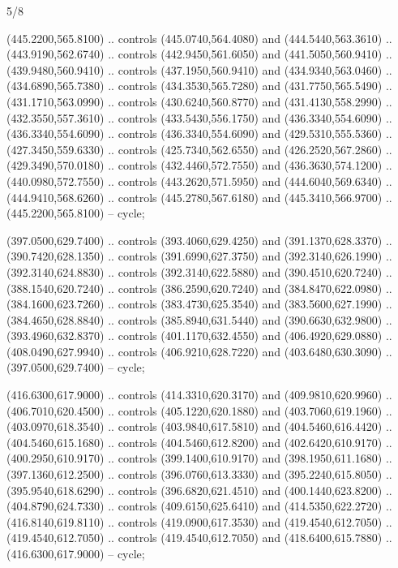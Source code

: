 \begin{flagdescription}{5/8}
\begin{scope}[shift={(m)}]
\begin{scope}[scale=\flagwidth/220,y=0.1mm, x=0.1mm, yscale=-1,shift={(-596,-360)}]
\begin{scope}[cm={{-1.0,0.0,0.0,1.0,(1193.9797,0.0)}}]
\begin{scope}[draw=black,line join=round,line cap=round,line width=0.381\lw]
\begin{scope}[line width=0.534\lw,fill=green]
 (445.2200,565.8100) .. controls (445.0740,564.4080) and
  (444.5440,563.3610) .. (443.9190,562.6740) .. controls (442.9450,561.6050) and
  (441.5050,560.9410) .. (439.9480,560.9410) .. controls (437.1950,560.9410) and
  (434.9340,563.0460) .. (434.6890,565.7380) .. controls (434.3530,565.7280) and
  (431.7750,565.5490) .. (431.1710,563.0990) .. controls (430.6240,560.8770) and
  (431.4130,558.2990) .. (432.3550,557.3610) .. controls (433.5430,556.1750) and
  (436.3340,554.6090) .. (436.3340,554.6090) .. controls (436.3340,554.6090) and
  (429.5310,555.5360) .. (427.3450,559.6330) .. controls (425.7340,562.6550) and
  (426.2520,567.2860) .. (429.3490,570.0180) .. controls (432.4460,572.7550) and
  (436.3630,574.1200) .. (440.0980,572.7550) .. controls (443.2620,571.5950) and
  (444.6040,569.6340) .. (444.9410,568.6260) .. controls (445.2780,567.6180) and
  (445.3410,566.9700) .. (445.2200,565.8100) -- cycle;

 (397.0500,629.7400) .. controls (393.4060,629.4250) and
  (391.1370,628.3370) .. (390.7420,628.1350) .. controls (391.6990,627.3750) and
  (392.3140,626.1990) .. (392.3140,624.8830) .. controls (392.3140,622.5880) and
  (390.4510,620.7240) .. (388.1540,620.7240) .. controls (386.2590,620.7240) and
  (384.8470,622.0980) .. (384.1600,623.7260) .. controls (383.4730,625.3540) and
  (383.5600,627.1990) .. (384.4650,628.8840) .. controls (385.8940,631.5440) and
  (390.6630,632.9800) .. (393.4960,632.8370) .. controls (401.1170,632.4550) and
  (406.4920,629.0880) .. (408.0490,627.9940) .. controls (406.9210,628.7220) and
  (403.6480,630.3090) .. (397.0500,629.7400) -- cycle;

 (416.6300,617.9000) .. controls (414.3310,620.3170) and
  (409.9810,620.9960) .. (406.7010,620.4500) .. controls (405.1220,620.1880) and
  (403.7060,619.1960) .. (403.0970,618.3540) .. controls (403.9840,617.5810) and
  (404.5460,616.4420) .. (404.5460,615.1680) .. controls (404.5460,612.8200) and
  (402.6420,610.9170) .. (400.2950,610.9170) .. controls (399.1400,610.9170) and
  (398.1950,611.1680) .. (397.1360,612.2500) .. controls (396.0760,613.3330) and
  (395.2240,615.8050) .. (395.9540,618.6290) .. controls (396.6820,621.4510) and
  (400.1440,623.8200) .. (404.8790,624.7330) .. controls (409.6150,625.6410) and
  (414.5350,622.2720) .. (416.8140,619.8110) .. controls (419.0900,617.3530) and
  (419.4540,612.7050) .. (419.4540,612.7050) .. controls (419.4540,612.7050) and
  (418.6400,615.7880) .. (416.6300,617.9000) -- cycle;


\end{scope}
\end{scope}
\end{scope}
\end{scope}
\end{scope}
\end{flagdescription}
